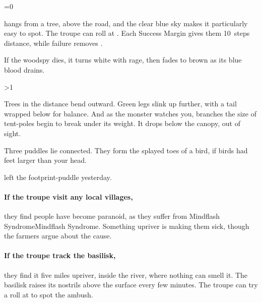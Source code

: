 \ifnum\value{cycle}=0

 hangs from a tree, above the road, and the clear blue sky makes it particularly easy to spot.
The troupe can roll  at \tn[10].
Each Success Margin gives them 10~\glspl{step} distance, while failure removes .

\woodspy

If the \gls{woodspy} dies, it turns white with rage, then fades to brown as its blue blood drains.

\else

\basilisk


\ifnum\theAthletics>1
  \begin{boxtext}
  Trees in the distance bend outward.
  Green legs slink up further, with a tail wrapped below for balance.
  And as the monster watches you, branches the size of tent-poles begin to break under its weight.
  It drops below the canopy, out of sight.
  \end{boxtext}
\else
  \begin{boxtext}
    Three puddles lie connected.
    They form the splayed toes of a bird, if birds had feet larger than your head.
  \end{boxtext}

   left the footprint-puddle yesterday.

  \paragraph{If the troupe visit any local \glspl{village},}
  they find people have become paranoid, as they suffer from Mindflash SyndromeMindflash Syndrome.%
  Something upriver is making them sick, though the farmers argue about the cause.

  \paragraph{If the troupe track the \gls{basilisk},}
  they find it five miles upriver, inside the river, where nothing can smell it.
  The \gls{basilisk} raises its nostrils above the surface every few minutes.
  The troupe can try a  roll at \tn[10] to spot the \gls{ambush}.

\fi


\fi

